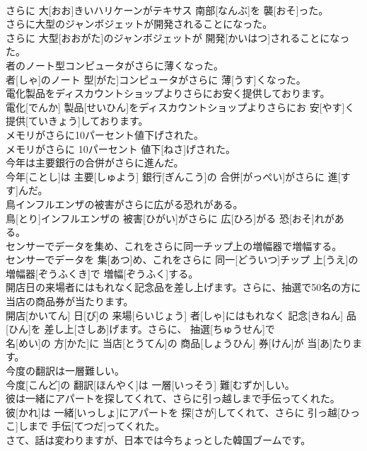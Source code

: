 \documentclass[8pt]{extreport}
\begin{document}
\begin{CJK}{UTF8}{min}
\\	さらに 大[おお]きいハリケーンがテキサス 南部[なんぶ]を 襲[おそ]った。
\\	さらに大型のジャンボジェットが開発されることになった。	
\\	さらに 大型[おおがた]のジャンボジェットが 開発[かいはつ]されることになった。
\\	者のノート型コンピュータがさらに薄くなった。	
\\	者[しゃ]のノート 型[がた]コンピュータがさらに 薄[うす]くなった。
\\	電化製品をディスカウントショップよりさらにお安く提供しております。	
\\	電化[でんか] 製品[せいひん]をディスカウントショップよりさらにお 安[やす]く 提供[ていきょう]しております。
\\	メモリがさらに10パーセント値下げされた。	
\\	メモリがさらに 10パーセント 値下[ねさ]げされた。
\\	今年は主要銀行の合併がさらに進んだ。	
\\	今年[ことし]は 主要[しゅよう] 銀行[ぎんこう]の 合併[がっぺい]がさらに 進[すす]んだ。
\\	鳥インフルエンザの被害がさらに広がる恐れがある。	
\\	鳥[とり]インフルエンザの 被害[ひがい]がさらに 広[ひろ]がる 恐[おそ]れがある。
\\	センサーでデータを集め、これをさらに同一チップ上の増幅器で増幅する。	
\\	センサーでデータを 集[あつ]め、これをさらに 同一[どういつ]チップ 上[うえ]の 増幅器[ぞうふくき]で 増幅[ぞうふく]する。
\\	開店日の来場者にはもれなく記念品を差し上げます。さらに、抽選で50名の方に当店の商品券が当たります。	
\\	開店[かいてん] 日[び]の 来場[らいじょう] 者[しゃ]にはもれなく 記念[きねん] 品[ひん]を 差し上[さしあ]げます。さらに、 抽選[ちゅうせん]で 
\\	名[めい]の 方[かた]に 当店[とうてん]の 商品[しょうひん] 券[けん]が 当[あ]たります。
\\	今度の翻訳は一層難しい。	
\\	今度[こんど]の 翻訳[ほんやく]は 一層[いっそう] 難[むずか]しい。
\\	彼は一緒にアパートを探してくれて、さらに引っ越しまで手伝ってくれた。	
\\	彼[かれ]は 一緒[いっしょ]にアパートを 探[さが]してくれて、さらに 引っ越[ひっこ]しまで 手伝[てつだ]ってくれた。
\\	さて、話は変わりますが、日本では今ちょっとした韓国ブームです。	

\end{CJK}
\end{document}
